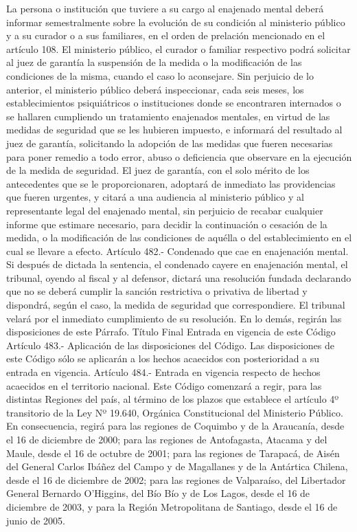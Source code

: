     La persona o institución que tuviere a su cargo al enajenado mental deberá informar semestralmente sobre la evolución de su condición al ministerio público y a su curador o a sus familiares, en el orden de prelación mencionado en el artículo 108.
    El ministerio público, el curador o familiar respectivo podrá solicitar al juez de garantía la suspensión de la medida o la modificación de las condiciones de la misma, cuando el caso lo aconsejare.
    Sin perjuicio de lo anterior, el ministerio público deberá inspeccionar, cada seis meses, los establecimientos psiquiátricos o instituciones donde se encontraren internados o se hallaren cumpliendo un tratamiento enajenados mentales, en virtud de las medidas de seguridad que se les hubieren impuesto, e informará del resultado al juez de garantía, solicitando la adopción de las medidas que fueren necesarias para poner remedio a todo error, abuso o deficiencia que observare en la ejecución de la medida de seguridad.
    El juez de garantía, con el solo mérito de los antecedentes que se le proporcionaren, adoptará de inmediato las providencias que fueren urgentes, y citará a una audiencia al ministerio público y al representante legal del enajenado mental, sin perjuicio de recabar cualquier informe que estimare necesario, para decidir la continuación o cesación de la medida, o la modificación de las condiciones de aquélla o del establecimiento en el cual se llevare a efecto.
    Artículo 482.- Condenado que cae en enajenación mental. Si después de dictada la sentencia, el condenado cayere en enajenación mental, el tribunal, oyendo al fiscal y al defensor, dictará una resolución fundada declarando que no se deberá cumplir la sanción restrictiva o privativa de libertad y dispondrá, según el caso, la medida de seguridad que correspondiere. El tribunal velará por el inmediato cumplimiento de su resolución. En lo demás, regirán las disposiciones de este Párrafo.
    Título Final
    Entrada en vigencia de este Código
    Artículo 483.- Aplicación de las disposiciones del Código. Las disposiciones de este Código sólo se aplicarán a los hechos acaecidos con posterioridad a su entrada en vigencia.
    Artículo 484.- Entrada en vigencia respecto de hechos acaecidos en el territorio nacional. Este Código comenzará a regir, para las distintas Regiones del país, al término de los plazos que establece el artículo 4º transitorio de la Ley Nº 19.640, Orgánica Constitucional del Ministerio Público.
    En consecuencia, regirá para las regiones de Coquimbo y de la Araucanía, desde el 16 de diciembre de 2000; para las regiones de Antofagasta, Atacama y del Maule, desde el 16 de octubre de 2001; para las regiones de Tarapacá, de Aisén del General Carlos Ibáñez del Campo y de Magallanes y de la Antártica Chilena, desde el 16 de diciembre de 2002; para las regiones de Valparaíso, del Libertador General Bernardo O'Higgins, del Bío Bío y de Los Lagos, desde el 16 de diciembre de 2003, y para la Región Metropolitana de Santiago, desde el 16 de junio de 2005.

